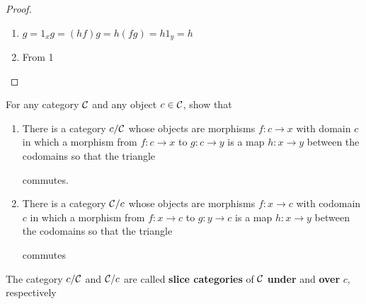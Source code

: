 \documentclass[11pt]{article}
\begin{document}
\begin{proof}
\begin{enumerate}
\item \(g=1_xg=(hf)g=h(fg)=h1_y=h\)
\item From 1
\end{enumerate}
\end{proof}

\begin{exercise}
\label{ex1.1.3}
For any category \(\mathcal{C}\) and any object \(c\in\mathcal{C}\), show that
\begin{enumerate}
\item There is a category \(c/\mathcal{C}\) whose objects are morphisms \(f:c\to x\) with domain \(c\) in which
a morphism from \(f:c\to x\) to \(g:c\to y\) is a map \(h:x\to y\) between the codomains so that
the triangle
\begin{center}\end{center}
commutes.
\item There is a category \(\mathcal{C}/c\) whose objects are morphisms \(f:x\to c\) with codomain \(c\) in which
a morphism from \(f:x\to c\) to \(g:y\to c\) is a map \(h:x\to y\) between the codomains so that
the triangle
\begin{center}\end{center}
commutes
\end{enumerate}


The category \(c/\mathcal{C}\) and \(\mathcal{C}/c\) are called \textbf{slice categories} of \(\mathcal{C}\) \textbf{under} and \textbf{over} \(c\), respectively
\end{exercise}
\end{document}
